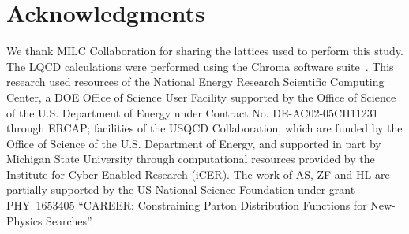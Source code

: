 \section*{Acknowledgments}
We thank MILC Collaboration for sharing the lattices used to perform this study.
The LQCD calculations were performed using the Chroma software suite~\cite{Edwards:2004sx}.
This research used resources of the National Energy Research Scientific Computing Center, a DOE Office of Science User Facility supported by the Office of Science of the U.S. Department of Energy under Contract No. DE-AC02-05CH11231 through ERCAP;
facilities of the USQCD Collaboration, which are funded by the Office of Science of the U.S. Department of Energy,
and supported in part by Michigan State University through computational resources provided by the Institute for Cyber-Enabled Research (iCER).
The work of AS, ZF and HL are partially supported by the US National Science Foundation under grant PHY~1653405 ``CAREER: Constraining Parton Distribution Functions for New-Physics Searches''.


